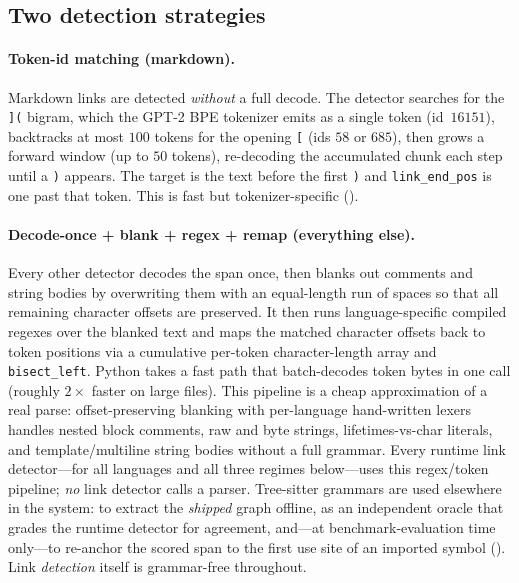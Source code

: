 \subsection{Two detection strategies}

\paragraph{Token-id matching (markdown).}
Markdown links are detected \emph{without} a full decode. The detector searches for
the \texttt{](} bigram, which the GPT-2 BPE tokenizer emits as a single token
(id~$16151$), backtracks at most $100$ tokens for the opening \texttt{[} (ids $58$
or $685$), then grows a forward window (up to $50$ tokens), re-decoding the
accumulated chunk each step until a \texttt{)} appears. The target is the text
before the first \texttt{)} and \texttt{link\_end\_pos} is one past that token. This
is fast but tokenizer-specific ().

\paragraph{Decode-once + blank + regex + remap (everything else).}
Every other detector decodes the span once, then blanks out comments and string
bodies by overwriting them with an equal-length run of spaces so that all remaining
character offsets are preserved. It then runs language-specific compiled regexes
over the blanked text and maps the matched character offsets back to token positions
via a cumulative per-token character-length array and \texttt{bisect\_left}. Python
takes a fast path that batch-decodes token bytes in one call (roughly $2\times$
faster on large files). This pipeline is a cheap approximation of a real parse:
offset-preserving blanking with per-language hand-written lexers handles nested
block comments, raw and byte strings, lifetimes-vs-char literals, and
template/multiline string bodies without a full grammar. Every runtime link
detector---for all languages and all three regimes below---uses this regex/token
pipeline; \emph{no} link detector calls a parser. Tree-sitter grammars
\citep{brunsfeld2018treesitter} are used elsewhere in the system: to extract the
\emph{shipped} graph offline, as an independent oracle that grades the runtime
detector for agreement, and---at benchmark-evaluation time only---to re-anchor the
scored span to the first use site of an imported symbol
(). Link \emph{detection} itself is grammar-free
throughout.

